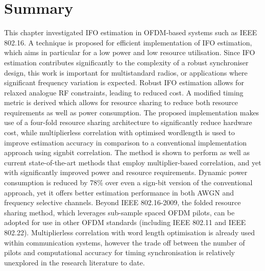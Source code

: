 \section{Summary}

This chapter investigated IFO estimation in OFDM-based systems such as IEEE 802.16. A technique is proposed for efficient implementation of IFO estimation, which aims in particular for a low power and low resource utilisation. 
Since IFO estimation contributes significantly to the complexity of a robust synchroniser design, this work is important for multistandard radios, or applications where significant frequency variation is expected. Robust IFO estimation allows for relaxed analogue RF constraints, leading to reduced cost. A modified timing metric is derived which allows for resource sharing to reduce both resource requirements as well as power consumption. The proposed implementation makes use of a four-fold resource sharing architecture to significantly reduce hardware cost, while multiplierless correlation with optimised wordlength is used to improve estimation accuracy in comparison to a conventional implementation approach using signbit correlation. 
The method is shown to perform as well as current state-of-the-art methods that employ multiplier-based correlation, and yet with significantly improved power and resource requirements. Dynamic power consumption is reduced by 78\% over even a sign-bit version of the conventional approach, yet it offers better estimation performance in both AWGN and frequency selective channels.
Beyond IEEE 802.16-2009, the folded resource sharing method, which leverages sub-sample spaced OFDM pilots, can be adopted for use in other OFDM standards (including IEEE 802.11 and IEEE 802.22). Multiplierless correlation with word length optimisation is already used within communication systems, however the trade off between the number of pilots and computational accuracy for timing synchronisation is relatively unexplored in the research literature to date.
